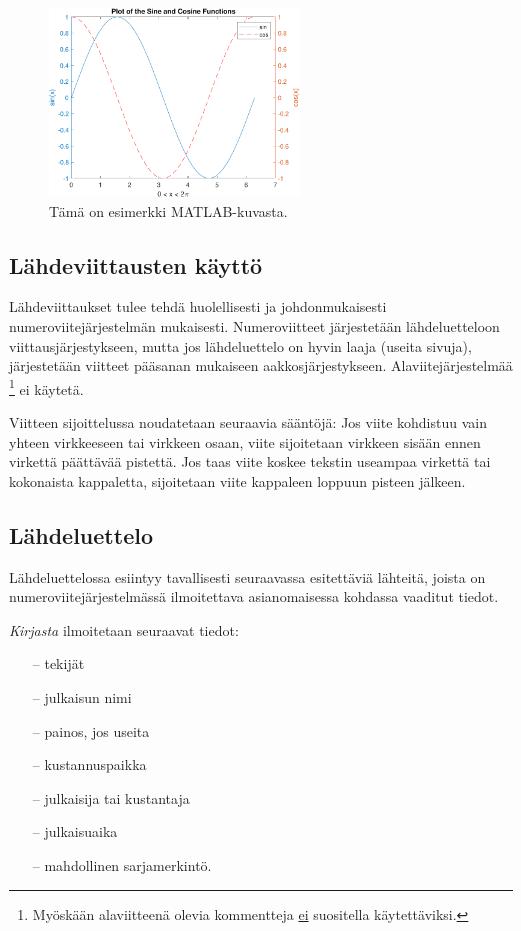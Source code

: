 \documentclass[english, 12pt, a4paper, sci, utf8, a-1b, online]{aaltothesis}
\begin{document}
\begin{figure}[htb]
\centering
\includegraphics[height=5cm]{curves.pdf}
\caption{Tämä on esimerkki MATLAB-kuvasta. \label{kuva2}}
\end{figure}


\subsection{Lähdeviittausten käyttö} 

Lähdeviittaukset tulee tehdä huolellisesti ja johdonmukaisesti
numeroviitejärjestelmän mukaisesti. Numeroviitteet järjestetään
lähdeluetteloon viittausjärjestykseen, mutta jos lähdeluettelo
on hyvin laaja (useita sivuja), järjestetään viitteet pääsanan 
mukaiseen aakkosjärjestykseen. Alaviitejärjestelmää
\footnote{Myöskään alaviitteenä olevia kommentteja \underline{ei} suositella
käytettäviksi.} ei käytetä. 

Viitteen sijoittelussa noudatetaan seuraavia sääntöjä:
Jos viite kohdistuu vain yhteen virkkeeseen tai virkkeen 
osaan, viite \citep{Kauranen} sijoitetaan virkkeen sisään ennen virkettä
päättävää pistettä. Jos taas viite koskee tekstin useampaa
virkettä tai kokonaista kappaletta, sijoitetaan viite kappaleen loppuun 
pisteen jälkeen. \citep{Kauranen} 

\subsection{Lähdeluettelo} 

Lähdeluettelossa esiintyy tavallisesti seuraavassa esitettäviä
lähteitä, joista on numeroviitejärjestelmässä ilmoitettava
asianomaisessa kohdassa vaaditut tiedot.

\textit{Kirjasta} ilmoitetaan seuraavat tiedot:

\begin{itemize}
\item[--]tekijät 
\item[--]julkaisun nimi
\item[--]painos, jos useita
\item[--]kustannuspaikka
\item[--]julkaisija tai kustantaja
\item[--]julkaisuaika
\item[--]mahdollinen sarjamerkintö. 
\end{itemize}
\end{document}
